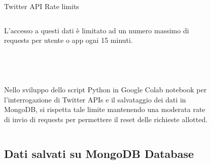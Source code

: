\documentclass[xcolor=svgnames, aspectratio=169]{beamer}
\begin{document}
\begin{frame}{Twitter API Rate limits}
    \fontsize{10pt}{10}\selectfont
    \begin{columns}[t]
        L'accesso a questi dati è limitato ad un numero massimo di requests per utente o app ogni 15 minuti.\\~\\~\\~\\~\\
        
        Nello sviluppo dello script Python in Google Colab notebook per l'interrogazione di Twitter APIs e il salvataggio dei dati in MongoDB, si rispetta tale limite mantenendo una moderata rate di invio di requests per permettere il reset delle richieste allotted.
        
        \vspace*{-48pt}
        \begin{figure}[H]
            \centering
            \noindent{}
        \end{figure}
    \end{columns}
\end{frame}


\subsection{Dati salvati su MongoDB Database}
\end{document}
